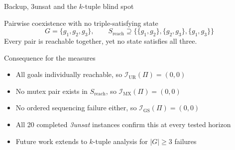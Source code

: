 
\begin{frame}[noframenumbering]{Backup, 3unsat and the $k$-tuple blind spot}
    \hypertarget{bk:3unsat}{}
    \begin{exampleblock}{Pairwise coexistence with no triple-satisfying state}
        \[
            G = \{g_1, g_2, g_3\}, \qquad
            S_{\text{reach}} \supseteq \{\{g_1, g_2\}, \{g_2, g_3\}, \{g_1, g_3\}\}
        \]
        Every pair is reachable together, yet no state satisfies all three.
    \end{exampleblock}

    \begin{block}{Consequence for the measures}
        \begin{itemize}
            \item All goals individually reachable, so $\mathcal{I}_{\text{UR}}(\Pi) = (0, 0)$
            \item No mutex pair exists in $S_{\text{reach}}$, so $\mathcal{I}_{\text{MX}}(\Pi) = (0, 0)$
            \item No ordered sequencing failure either, so $\mathcal{I}_{\text{GS}}(\Pi) = (0, 0)$
            \item All 20 completed \textit{3unsat} instances confirm this at every tested horizon
            \item Future work extends to $k$-tuple analysis for $|G| \geq 3$ failures
        \end{itemize}
    \end{block}

\end{frame}
